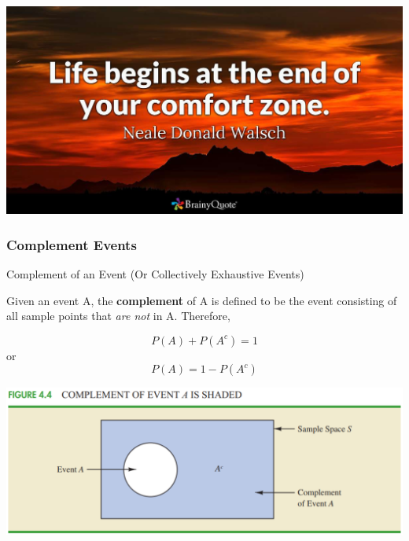 \documentclass{beamer}
\begin{document}
\begin{frame}
\begin{center}
\includegraphics[scale=0.26]{images/comfortZone.jpg}

\end{center}
\end{frame}

\subsubsection{Complement Events}

\begin{frame}{Complement of an Event (Or Collectively Exhaustive Events)}

Given an event A, the \textbf{complement} of A is defined to be the event consisting of all sample points that \textit{are not} in A. Therefore, 

$$ P(A) + P(A^c) = 1$$ 
or
$$ P(A) = 1 - P(A^c)$$

\vspace{0.3 cm}

\includegraphics[scale=0.4]{images/ch3VennComplement.png}

\end{frame}
\end{document}
